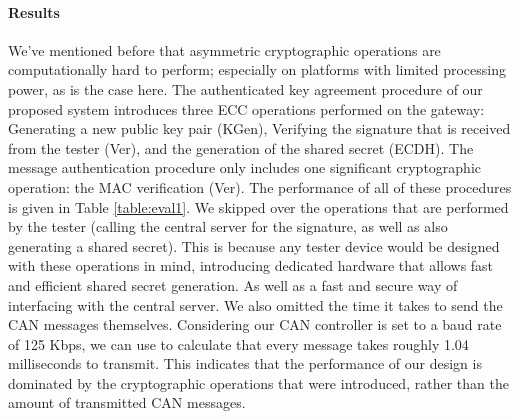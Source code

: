 \paragraph{Results}
We've mentioned before that asymmetric cryptographic operations are computationally hard to perform; especially on platforms with limited processing power, as is the case here. The authenticated key agreement procedure of our proposed system introduces three ECC operations performed on the gateway: Generating a new public key pair (KGen), Verifying the signature that is received from the tester (Ver), and the generation of the shared secret (ECDH). The message authentication procedure only includes one significant cryptographic operation: the MAC verification (Ver). The performance of all of these procedures is given in Table \ref{table:eval1}. We skipped over the operations that are performed by the tester (calling the central server for the signature, as well as also generating a shared secret). This is because any tester device would be designed with these operations in mind, introducing dedicated hardware that allows fast and efficient shared secret generation. As well as a fast and secure way of interfacing with the central server. We also omitted the time it takes to send the CAN messages themselves. Considering our CAN controller is set to a baud rate of 125 Kbps, we can use \cite{CANspeed} to calculate that every message takes roughly 1.04 milliseconds to transmit. This indicates that the performance of our design is dominated by the cryptographic operations that were introduced, rather than the amount of transmitted CAN messages.  
\begin{table}[]
	\caption{Performance of cryptographic operations on a resource constrained microcontroller.}
	\label{table:eval1}
\end{table}

